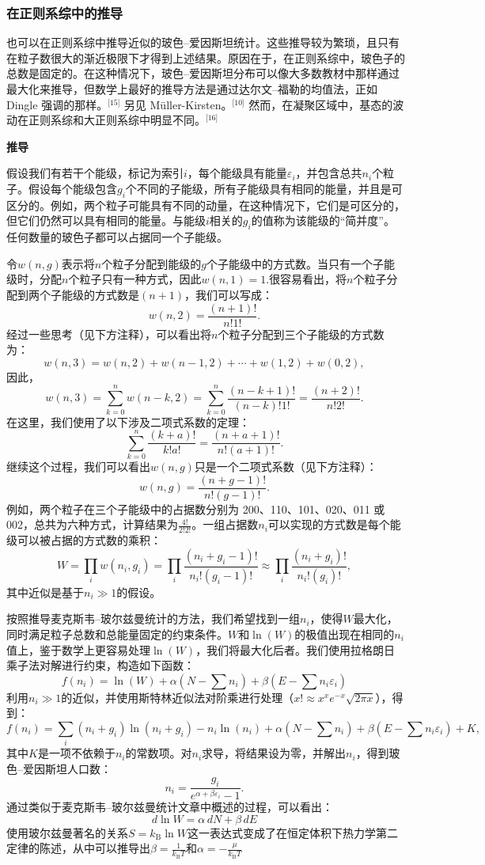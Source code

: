 \subsubsection{在正则系综中的推导}  
也可以在正则系综中推导近似的玻色–爱因斯坦统计。这些推导较为繁琐，且只有在粒子数很大的渐近极限下才得到上述结果。原因在于，在正则系综中，玻色子的总数是固定的。在这种情况下，玻色–爱因斯坦分布可以像大多数教材中那样通过最大化来推导，但数学上最好的推导方法是通过达尔文–福勒的均值法，正如 Dingle 强调的那样。\(^\text{[15]}\) 另见 Müller-Kirsten。\(^\text{[10]}\) 然而，在凝聚区域中，基态的波动在正则系综和大正则系综中明显不同。\(^\text{[16]}\)

\textbf{推导}  

假设我们有若干个能级，标记为索引\(i\)，每个能级具有能量\(\varepsilon_i \)，并包含总共\(n_i\)个粒子。假设每个能级包含\(g_i\)个不同的子能级，所有子能级具有相同的能量，并且是可区分的。例如，两个粒子可能具有不同的动量，在这种情况下，它们是可区分的，但它们仍然可以具有相同的能量。与能级\(i\)相关的\(g_i\)的值称为该能级的“简并度”。任何数量的玻色子都可以占据同一个子能级。

令\(w(n, g)\)表示将\(n\)个粒子分配到能级的\(g\)个子能级中的方式数。当只有一个子能级时，分配\(n\)个粒子只有一种方式，因此\(w(n, 1) = 1\).很容易看出，将\(n\)个粒子分配到两个子能级的方式数是\((n + 1)\)，我们可以写成：
\[
w(n, 2) = \frac{(n+1)!}{n!1!}.~
\]
经过一些思考（见下方注释），可以看出将\(n\)个粒子分配到三个子能级的方式数为：
\[
w(n, 3) = w(n, 2) + w(n-1, 2) + \cdots + w(1, 2) + w(0, 2),~
\]
因此，
\[
w(n, 3) = \sum_{k=0}^{n} w(n-k, 2) = \sum_{k=0}^{n} \frac{(n-k+1)!}{(n-k)!1!} = \frac{(n+2)!}{n!2!}.~
\]
在这里，我们使用了以下涉及二项式系数的定理：
\[
\sum_{k=0}^{n} \frac{(k+a)!}{k!a!} = \frac{(n+a+1)!}{n!(a+1)!}.~
\]
继续这个过程，我们可以看出\(w(n, g)\)只是一个二项式系数（见下方注释）：
\[
w(n, g) = \frac{(n+g-1)!}{n!(g-1)!}.~
\]
例如，两个粒子在三个子能级中的占据数分别为 200、110、101、020、011 或 002，总共为六种方式，计算结果为\( \frac{4!}{2!2!}\)。一组占据数\(n_i \)可以实现的方式数是每个能级可以被占据的方式数的乘积：
\[
W = \prod_i w(n_i, g_i) = \prod_i \frac{(n_i + g_i - 1)!}{n_i!(g_i - 1)!} \approx \prod_i \frac{(n_i + g_i)!}{n_i!(g_i)!},~
\]
其中近似是基于\(n_i \gg 1\)的假设。

按照推导麦克斯韦–玻尔兹曼统计的方法，我们希望找到一组\(n_i\)，使得\(W\)最大化，同时满足粒子总数和总能量固定的约束条件。\(W\)和\( \ln(W)\)的极值出现在相同的\(n_i\)值上，鉴于数学上更容易处理\(\ln(W)\)，我们将最大化后者。我们使用拉格朗日乘子法对解进行约束，构造如下函数：
\[
f(n_i) = \ln(W) + \alpha (N - \sum n_i) + \beta (E - \sum n_i \varepsilon_i)~
\]
利用\(n_i \gg 1\)的近似，并使用斯特林近似法对阶乘进行处理（\(x! \approx x^x e^{-x} \sqrt{2 \pi x}\)），得到：
\[
f(n_i) = \sum_i (n_i + g_i) \ln(n_i + g_i) - n_i \ln(n_i) + \alpha (N - \sum n_i) + \beta (E - \sum n_i \varepsilon_i) + K,~
\]
其中\(K\)是一项不依赖于\(n_i\)的常数项。对\(n_i\)求导，将结果设为零，并解出\(n_i\)，得到玻色–爱因斯坦人口数：
\[
n_i = \frac{g_i}{e^{\alpha + \beta \varepsilon_i} - 1}.~
\]
通过类似于麦克斯韦–玻尔兹曼统计文章中概述的过程，可以看出：
\[
d \ln W = \alpha \, dN + \beta \, dE~
\]
使用玻尔兹曼著名的关系\(S = k_{\text{B}} \ln W\)这一表达式变成了在恒定体积下热力学第二定律的陈述，从中可以推导出\(\beta = \frac{1}{k_{\text{B}} T}\)和\(\alpha = -\frac{\mu}{k_{\text{B}} T}\)


